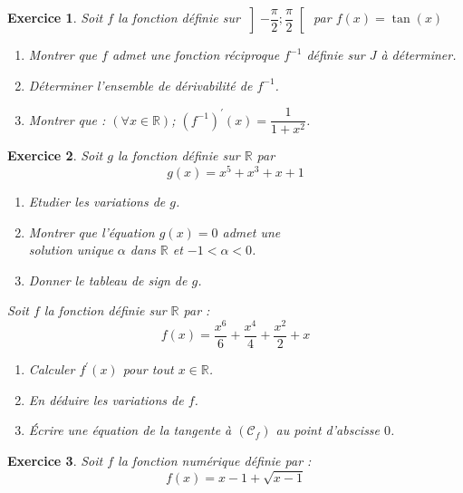 \documentclass[12pt,a4paper]{article}
\theoremstyle{mystyle}
\newtheorem{exo}{Exercice}
\begin{document}
\begin{multicols*}{2}
\begin{exo}
	Soit $f$ la fonction définie sur $\left]-\dfrac{\pi}{2};\dfrac{\pi}{2}\right[$ par $f(x) = \tan(x)$
	\begin{enumerate}
		\item Montrer que $f$ admet une fonction réciproque $f^{-1}$ définie sur $J$ à déterminer.
		\item Déterminer l'ensemble de dérivabilité de $f^{-1}$.
		\item Montrer que : $(\forall x\in\mathbb{R})$; $\left(f^{-1}\right)^{\prime}(x) = \dfrac{1}{1 + x^2}$.
	\end{enumerate}
\end{exo}



\begin{exo}
Soit $g$ la fonction définie sur $\mathbb{R}$ par $$g(x) = x^5 + x^3 + x + 1$$
	\begin{enumerate}
		\item Etudier les variations de $g$.
		\item Montrer que l'équation $g(x) = 0$ admet une \\ solution unique $\alpha$ dans $\mathbb{R}$ et $-1 < \alpha < 0$.
		\item Donner le tableau de sign de $g$.	
	\end{enumerate}
	Soit $f$ la fonction définie sur $\mathbb{R}$ par :\\
		 $$f(x) = \dfrac{x^6}{6} + \dfrac{x^4}{4} + \dfrac{x^2}{2} + x$$
	\begin{enumerate}
		\item[4.] Calculer $f^{\prime}(x)$ pour tout $x\in\mathbb{R}$.
		\item[5.] En déduire les variations de $f$.
		\item[6.] Écrire une équation de la tangente à $(\mathcal{C}_f)$ au point d'abscisse $0$.
	\end{enumerate}
\end{exo}

\begin{exo}

Soit $f$ la fonction numérique définie par : $$f(x) = x - 1 + \sqrt{x - 1}$$


\end{exo}
\end{multicols*}
\end{document}

